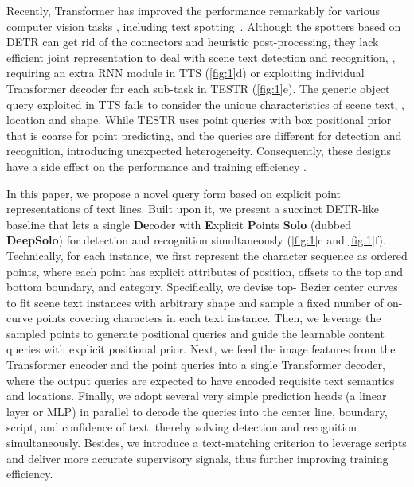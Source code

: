 \documentclass[10pt,twocolumn,letterpaper]{article}
\begin{document}
Recently, Transformer \cite{vaswani2017attention} has improved the performance remarkably for various computer vision tasks \cite{dosovitskiy2020image,liu2021swin,liu2022swin,wang2021pyramid,touvron2021training,xu2021vitae,zhang2022vitaev2,du2022i3cl,peng2021conformer,li2022panoptic}, including text spotting~\cite{huang2022swintextspotter,zhang2022text,peng2022spts,kittenplon2022towards}. Although the spotters \cite{zhang2022text,kittenplon2022towards} based on DETR \cite{carion2020end} can get rid of the connectors and heuristic post-processing, they lack efficient joint representation to deal with scene text detection and recognition, \eg, requiring an extra RNN module in TTS \cite{kittenplon2022towards} (\cref{fig:1}d) or exploiting individual Transformer decoder for each sub-task in TESTR \cite{zhang2022text} (\cref{fig:1}e). The generic object query exploited in TTS fails to consider the unique characteristics of scene text, \eg, location and shape. While TESTR uses point queries with box positional prior that is coarse for point predicting, and the queries are different for detection and recognition, introducing unexpected heterogeneity. Consequently, these designs have a side effect on the performance and training efficiency \cite{ye2022dptext}.

In this paper, we propose a novel query form based on explicit point representations of text lines. Built upon it, we present a succinct DETR-like baseline that lets a single \textbf{De}coder with \textbf{E}xplicit \textbf{P}oints \textbf{Solo} (dubbed \textbf{DeepSolo}) for detection and recognition simultaneously (\cref{fig:1}c and \cref{fig:1}f). Technically, for each instance, we first represent the character sequence as ordered points, where each point has explicit attributes of position, offsets to the top and bottom boundary, and category. Specifically, we devise top- Bezier center curves to fit scene text instances with arbitrary shape and sample a fixed number of on-curve points covering characters in each text instance. Then, we leverage the sampled points to generate positional queries and guide the learnable content queries with explicit positional prior. Next, we feed the image features from the Transformer encoder and the point queries into a single Transformer decoder, where the output queries are expected to have encoded requisite text semantics and locations. Finally, we adopt several very simple prediction heads (a linear layer or MLP) in parallel to decode the queries into the center line, boundary, script, and confidence of text, thereby solving detection and recognition simultaneously. Besides, we introduce a text-matching criterion to leverage scripts and deliver more accurate supervisory signals, thus further improving training efficiency.
\end{document}

